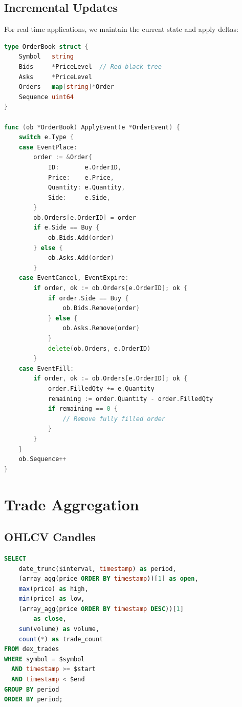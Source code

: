 \documentclass[11pt,twocolumn]{article}
\begin{document}
\subsection{Incremental Updates}

For real-time applications, we maintain the current state and apply deltas:

\begin{lstlisting}[language=Go,caption={Incremental book update}]
type OrderBook struct {
    Symbol   string
    Bids     *PriceLevel  // Red-black tree
    Asks     *PriceLevel
    Orders   map[string]*Order
    Sequence uint64
}

func (ob *OrderBook) ApplyEvent(e *OrderEvent) {
    switch e.Type {
    case EventPlace:
        order := &Order{
            ID:       e.OrderID,
            Price:    e.Price,
            Quantity: e.Quantity,
            Side:     e.Side,
        }
        ob.Orders[e.OrderID] = order
        if e.Side == Buy {
            ob.Bids.Add(order)
        } else {
            ob.Asks.Add(order)
        }
    case EventCancel, EventExpire:
        if order, ok := ob.Orders[e.OrderID]; ok {
            if order.Side == Buy {
                ob.Bids.Remove(order)
            } else {
                ob.Asks.Remove(order)
            }
            delete(ob.Orders, e.OrderID)
        }
    case EventFill:
        if order, ok := ob.Orders[e.OrderID]; ok {
            order.FilledQty += e.Quantity
            remaining := order.Quantity - order.FilledQty
            if remaining == 0 {
                // Remove fully filled order
            }
        }
    }
    ob.Sequence++
}
\end{lstlisting}

\section{Trade Aggregation}

\subsection{OHLCV Candles}

\begin{lstlisting}[language=SQL,caption={OHLCV candle generation}]
SELECT
    date_trunc($interval, timestamp) as period,
    (array_agg(price ORDER BY timestamp))[1] as open,
    max(price) as high,
    min(price) as low,
    (array_agg(price ORDER BY timestamp DESC))[1]
        as close,
    sum(volume) as volume,
    count(*) as trade_count
FROM dex_trades
WHERE symbol = $symbol
  AND timestamp >= $start
  AND timestamp < $end
GROUP BY period
ORDER BY period;
\end{lstlisting}
\end{document}
